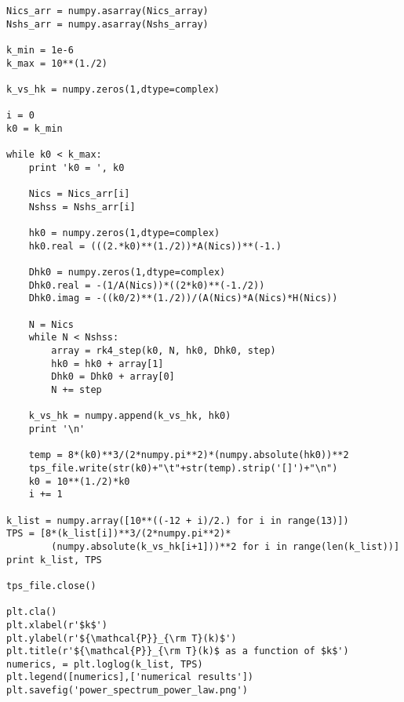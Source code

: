 \documentclass[12pt,a4paper,oneside]{book}
\begin{document}
\begin{appendices}
\begin{small}
\begin{verbatim}
Nics_arr = numpy.asarray(Nics_array)
Nshs_arr = numpy.asarray(Nshs_array)

k_min = 1e-6
k_max = 10**(1./2)

k_vs_hk = numpy.zeros(1,dtype=complex)

i = 0
k0 = k_min

while k0 < k_max:
    print 'k0 = ', k0

    Nics = Nics_arr[i]
    Nshss = Nshs_arr[i]

    hk0 = numpy.zeros(1,dtype=complex)
    hk0.real = (((2.*k0)**(1./2))*A(Nics))**(-1.)

    Dhk0 = numpy.zeros(1,dtype=complex)
    Dhk0.real = -(1/A(Nics))*((2*k0)**(-1./2))
    Dhk0.imag = -((k0/2)**(1./2))/(A(Nics)*A(Nics)*H(Nics))
 
    N = Nics
    while N < Nshss:
        array = rk4_step(k0, N, hk0, Dhk0, step)
        hk0 = hk0 + array[1]
        Dhk0 = Dhk0 + array[0]
        N += step

    k_vs_hk = numpy.append(k_vs_hk, hk0) 
    print '\n'
    
    temp = 8*(k0)**3/(2*numpy.pi**2)*(numpy.absolute(hk0))**2
    tps_file.write(str(k0)+"\t"+str(temp).strip('[]')+"\n")
    k0 = 10**(1./2)*k0
    i += 1

k_list = numpy.array([10**((-12 + i)/2.) for i in range(13)])
TPS = [8*(k_list[i])**3/(2*numpy.pi**2)*
		(numpy.absolute(k_vs_hk[i+1]))**2 for i in range(len(k_list))]
print k_list, TPS

tps_file.close()

plt.cla()
plt.xlabel(r'$k$')
plt.ylabel(r'${\mathcal{P}}_{\rm T}(k)$')
plt.title(r'${\mathcal{P}}_{\rm T}(k)$ as a function of $k$')
numerics, = plt.loglog(k_list, TPS)
plt.legend([numerics],['numerical results'])
plt.savefig('power_spectrum_power_law.png')

\end{verbatim}
\end{small}
\end{appendices}
\end{document}
